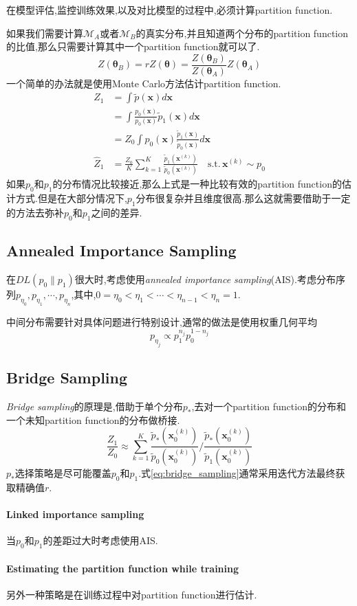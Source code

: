 在模型评估,监控训练效果,以及对比模型的过程中,必须计算partition function.

如果我们需要计算$\mathcal M_A$或者$\mathcal M_B$的真实分布,并且知道两个分布的partition function的比值,那么只需要计算其中一个partition function就可以了.
\begin{equation}
Z(\bm\theta_B)=rZ(\bm\theta)=\frac{Z(\bm\theta_B)}{Z(\bm\theta_A)}Z(\bm\theta_A)
\end{equation}
一个简单的办法就是使用Monte Carlo方法估计partition function.
\begin{equation}\begin{split}
Z_1&=\int\tilde p(\bm x)d\bm x\\
&=\int\frac{p_0(\bm x)}{p_0(\bm x)}\tilde p_1(\bm x)d\bm x\\
&=Z_0\int p_0(\bm x)\frac{\tilde p_1(\bm x)}{\tilde p_0(\bm x)}d\bm x\\
\hat Z_1&=\frac{Z_0}{K}\sum_{k=1}^K\frac{\tilde p_1(\bm x^{(k)})}{\tilde p_0(\bm x^{(k)})}\quad\text{s.t.}\,\bm x^{(k)}\sim p_0
\end{split}\end{equation}
如果$p_0$和$p_1$的分布情况比较接近,那么上式是一种比较有效的partition function的估计方式.但是在大部分情况下,$p_1$分布很复杂并且维度很高.那么这就需要借助于一定的方法去弥补$p_0$和$p_1$之间的差异.

\subsection{Annealed Importance Sampling}

在$DL(p_0\|p_1)$很大时,考虑使用\textit{annealed importance sampling}(AIS).考虑分布序列$p_{\eta_0},p_{\eta_1},\cdots,p_{\eta_n}$,其中,$0=\eta_0<\eta_1<\cdots<\eta_{n-1}<\eta_n=1$.

中间分布需要针对具体问题进行特别设计,通常的做法是使用权重几何平均
\begin{equation}
p_{\eta_j}\propto p_1^{n_j}p_0^{1-n_j}
\end{equation}

\subsection{Bridge Sampling}

\textit{Bridge sampling}的原理是,借助于单个分布$p_\ast$,去对一个partition function的分布和一个未知partition function的分布做桥接.
\begin{equation}\label{eq:bridge_sampling}
\frac{Z_1}{Z_0}\approx\sum_{k=1}^K\frac{\tilde p_\ast(\bm x_0^{(k)})}{\tilde p_0(\bm x_0^{(k)})}\Big/\frac{\tilde p_\ast(\bm x_0^{(k)})}{\tilde p_1(\bm x_0^{(k)})}
\end{equation}
$p_\ast$选择策略是尽可能覆盖$p_0$和$p_1$.式\ref{eq:bridge_sampling}通常采用迭代方法最终获取精确值$r$.

\paragraph{Linked importance sampling}当$p_0$和$p_1$的差距过大时考虑使用AIS.

\paragraph{Estimating the partition function while training}另外一种策略是在训练过程中对partition function进行估计.